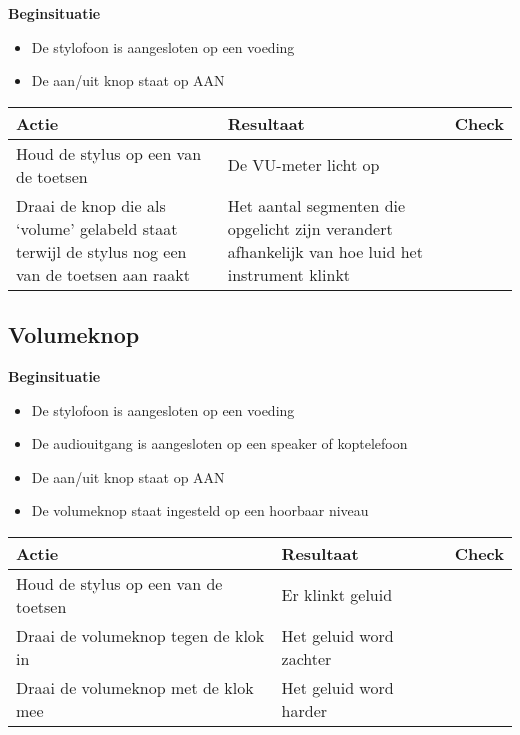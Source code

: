 \documentclass[12pt, a4paper, dutch]{article}
\newcommand{\cb}{\Square}
\newcommand{\stroom}{De stylofoon is aangesloten op een voeding}
\newcommand{\audio}{De audiouitgang is aangesloten op een speaker of koptelefoon}
\newcommand{\aan}{De aan/uit knop staat op AAN}
\newcommand{\vol}{De volumeknop staat ingesteld op een hoorbaar niveau}
\begin{document}
\begin{minipage}{\textwidth}
\textbf{Beginsituatie}
\begin{itemize}
	\item \stroom
	\item \aan
\end{itemize}

\medskip

\begin{tabularx}{\textwidth}{p{}p{}>{\raggedleft\arraybackslash}X}
\toprule
\textbf{Actie} & \textbf{Resultaat} & \textbf{Check}\\
\midrule
Houd de stylus op een van de toetsen &
De VU-meter licht op &
\cb\\

Draai de knop die als `volume' gelabeld staat terwijl de stylus nog een van de
toetsen aan raakt &
Het aantal segmenten die opgelicht zijn verandert afhankelijk van hoe luid het
instrument klinkt &
\cb\\
\bottomrule
\end{tabularx}
\end{minipage}

\subsection{Volumeknop}

\begin{minipage}{\textwidth}
\textbf{Beginsituatie}
\begin{itemize}
	\item \stroom
	\item \audio
	\item \aan
	\item \vol
\end{itemize}

\medskip

\begin{tabularx}{\textwidth}{p{}p{}>{\raggedleft\arraybackslash}X}
\toprule
\textbf{Actie} & \textbf{Resultaat} & \textbf{Check}\\
\midrule
Houd de stylus op een van de toetsen &
Er klinkt geluid &
\cb\\

Draai de volumeknop tegen de klok in &
Het geluid word zachter &
\cb\\

Draai de volumeknop met de klok mee &
Het geluid word harder &
\cb\\
\bottomrule
\end{tabularx}
\end{minipage}
\end{document}
